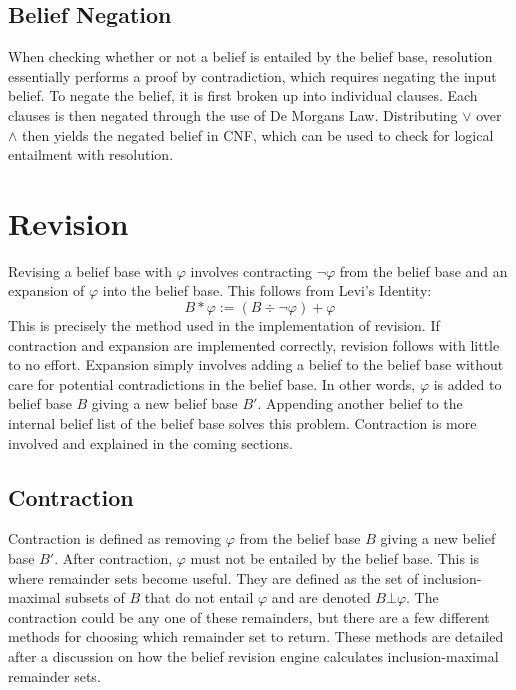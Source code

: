 \documentclass[a4paper,10pt]{article}
\begin{document}
\subsection{Belief Negation}
\label{subsec:negation}
When checking whether or not a belief is entailed by the belief base, resolution essentially performs a proof by contradiction, which requires negating the input belief.
To negate the belief, it is first broken up into individual clauses. Each clauses is then negated through the use of De Morgans Law. Distributing $\vee$ over $\wedge$
then yields the negated belief in CNF, which can be used to check for logical entailment with resolution.

\section{Revision}
\label{sec:revision}
Revising a belief base with $\varphi$ involves contracting $\neg\varphi$ from the belief base and an expansion of $\varphi$ into the belief base. This follows from Levi's Identity:
\[B * \varphi := (B \div \neg \varphi) + \varphi\] 
This is precisely the method used in the implementation of revision. If contraction and expansion are implemented correctly, revision follows with little to no effort. Expansion simply involves adding a belief to the belief base without care for potential contradictions in the belief base. In other words, $\varphi$ is added to belief base $B$ giving a new belief base $B'$. Appending another belief to the internal belief list of the belief base solves this problem. Contraction is more involved and explained in the coming sections. 

\subsection{Contraction}
\label{subsec:contraction}
Contraction is defined as removing $\varphi$ from the belief base $B$ giving a new belief base $B'$. After contraction, $\varphi$ must not be entailed by the belief base. This is where remainder sets become useful. They are defined as the set of inclusion-maximal subsets of $B$ that do not entail $\varphi$ and are denoted $B \bot\varphi$. The contraction could be any one of these remainders, but there are a few different methods for choosing which remainder set to return. These methods are detailed after a discussion on how the belief revision engine calculates inclusion-maximal remainder sets.
\end{document}
